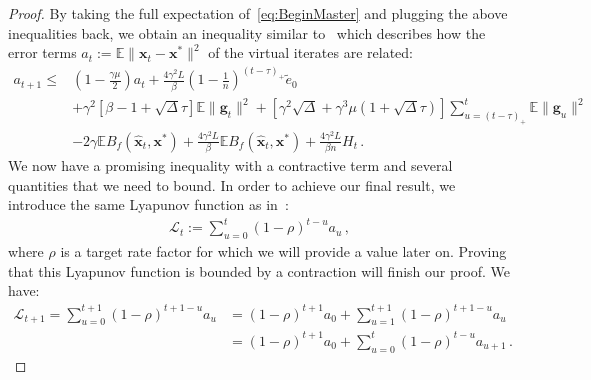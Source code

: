 \documentclass{article}
\def\EE{{\mathbb E}}
\def\xx{{\boldsymbol x}}
\begin{document}
\begin{proof}
  By taking the full expectation of~\eqref{eq:BeginMaster} and plugging the above inequalities back, we obtain an inequality similar to~\citet[Master inequality (28)]{leblond2016Asaga} which describes how the error terms $a_t := \EE \|\xx_t - \xx^*\|^2$ of the virtual iterates are related:
  \begin{equation}\label{eq:masterineq}
  \begin{aligned}
    a_{t+1} \leq
    &(1 - \frac{\gamma \mu}{2})a_t
       + \frac{4 \gamma^2 L}{\beta} (1 - \frac{1}{n})^{(t - \tau)_+}\tilde{e}_0 \\
    &+ \gamma^2\left[\beta - 1 + \sqrt{\Delta}\tau \right] \EE \|\boldsymbol g_t\|^2
       + \left[\gamma^2 \sqrt{\Delta} + \gamma^3 \mu (1 + \sqrt{\Delta}\tau) \right]\sum_{u=(t-\tau)_+}^t \EE \|\boldsymbol g_u\|^2\\
    &- 2 \gamma \EE B_f(\hat{\xx}_t, \xx^*) + \frac{4\gamma^2 L}{\beta} \EE B_f(\hat{\xx}_t, \xx^*)  + \frac{4 \gamma^2 L}{\beta n} H_t \, .
  \end{aligned}
  \end{equation}
  We now have a promising inequality with a contractive term and several quantities that we need to bound.
  In order to achieve our final result, we introduce the same Lyapunov function as in~\citet{leblond2016Asaga}:
  $$
  \begin{aligned}
    \mathcal{L}_t := \sum_{u=0}^t (1 - \rho)^{t-u} a_u \,,
  \end{aligned}
  $$
  where $\rho$ is a target rate factor for which we will provide a value later on.
  Proving that this Lyapunov function is bounded by a contraction will finish our proof.
  We have:
  \begin{align}
    \mathcal{L}_{t+1} = \sum_{u=0}^{t+1} (1 - \rho)^{t+1-u} a_u
    &= (1 - \rho)^{t+1}a_0
    + \sum_{u=1}^{t+1}(1 - \rho)^{t+1-u}a_u
    \nonumber \\
    &= (1 - \rho)^{t+1}a_0
    + \sum_{u=0}^t(1 - \rho)^{t-u}a_{u+1} \,  .
  \end{align}


\end{proof}
\end{document}
